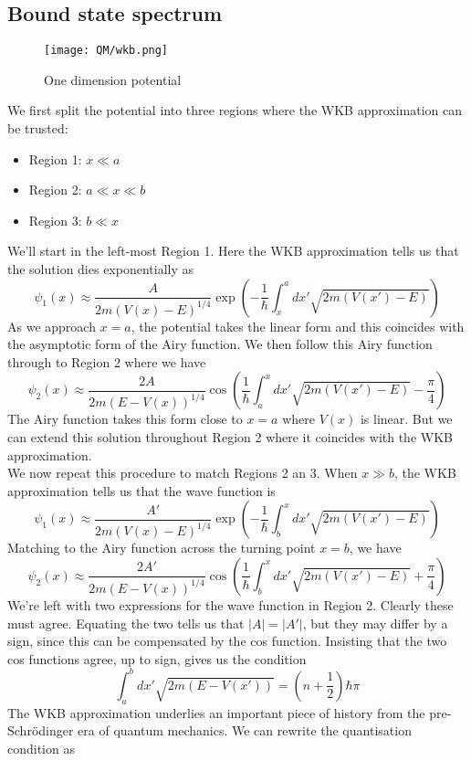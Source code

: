 \subsection{Bound state spectrum}
\begin{figure}[!h]
	\centering
	\texttt{[image: QM/wkb.png]}
	\caption{One dimension potential}
\end{figure}
\noindent
We first split the potential into three regions where the WKB approximation can be trusted:
\begin{itemize}
\item Region 1: $x \ll a$
\item Region 2: $a \ll x \ll b$
\item Region 3: $b \ll x$
\end{itemize}
We'll start in the left-most Region 1. Here the WKB
approximation tells us that the solution dies exponentially as
\[\psi_1(x) \approx \frac{A}{2m(V(x) - E)^{1/4}} \exp \left( -\frac{1}{\hbar} \int_{x}^a dx' \sqrt{2m(V(x')-E)} \right)\]
As we approach $x = a$, the potential takes the linear form and this coincides with the asymptotic form of the Airy function. We then follow this Airy function through to Region 2 where we have
\[\psi_2(x) \approx \frac{2A}{2m(E - V(x))^{1/4}} \cos \left( \frac{1}{\hbar} \int_{a}^x dx' \sqrt{2m(V(x')-E)} - \frac{\pi}{4} \right)\]
The Airy function takes this form close to $x = a$ where $V(x)$ is linear. But we can extend this solution throughout Region 2 where it coincides with the WKB approximation.
\\
We now repeat this procedure to match Regions 2 an 3. When $x \gg b$, the WKB approximation tells us that the wave function is
\[\psi_1(x) \approx \frac{A'}{2m(V(x) - E)^{1/4}} \exp \left( -\frac{1}{\hbar} \int_{b}^x dx' \sqrt{2m(V(x')-E)} \right)\]
Matching to the Airy function across the turning point $x = b$, we have
\[\psi_2(x) \approx \frac{2A'}{2m(E - V(x))^{1/4}} \cos \left( \frac{1}{\hbar} \int_{b}^x dx' \sqrt{2m(V(x')-E)} + \frac{\pi}{4} \right)\]
We're left with two expressions for the wave function in Region 2.
Clearly these must agree. Equating the two tells us that $|A| = |A'|$, but they may differ by a sign, since this can be compensated by the cos function. Insisting that the two cos functions agree, up to sign, gives us the condition
\[\int_a^b dx' \sqrt{2m(E-V(x'))} = \left( n + \frac{1}{2} \right) \hbar \pi\]
The WKB approximation underlies an important piece of history from the pre-Schr\"{o}dinger era of quantum mechanics. 
We can rewrite the quantisation condition as
